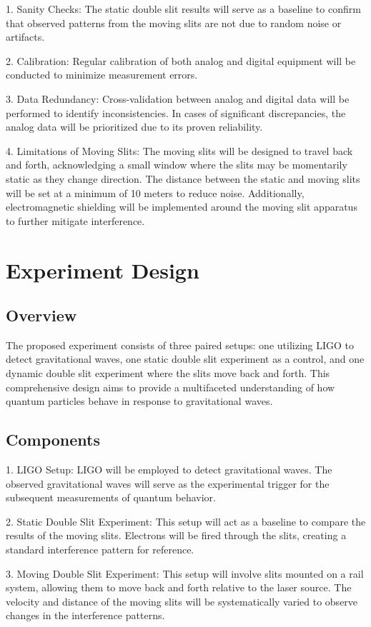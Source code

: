 \documentclass{article}
\begin{document}
1. Sanity Checks: The static double slit results will serve as a baseline to confirm that observed patterns from the moving slits are not due to random noise or artifacts.

2. Calibration: Regular calibration of both analog and digital equipment will be conducted to minimize measurement errors.

3. Data Redundancy: Cross-validation between analog and digital data will be performed to identify inconsistencies. In cases of significant discrepancies, the analog data will be prioritized due to its proven reliability.

4. Limitations of Moving Slits: The moving slits will be designed to travel back and forth, acknowledging a small window where the slits may be momentarily static as they change direction. The distance between the static and moving slits will be set at a minimum of 10 meters to reduce noise. Additionally, electromagnetic shielding will be implemented around the moving slit apparatus to further mitigate interference.

\section{Experiment Design}

\subsection{Overview}
The proposed experiment consists of three paired setups: one utilizing LIGO to detect gravitational waves, one static double slit experiment as a control, and one dynamic double slit experiment where the slits move back and forth. This comprehensive design aims to provide a multifaceted understanding of how quantum particles behave in response to gravitational waves.

\subsection{Components}
1. LIGO Setup: LIGO will be employed to detect gravitational waves. The observed gravitational waves will serve as the experimental trigger for the subsequent measurements of quantum behavior.

2. Static Double Slit Experiment: This setup will act as a baseline to compare the results of the moving slits. Electrons will be fired through the slits, creating a standard interference pattern for reference.

3. Moving Double Slit Experiment: This setup will involve slits mounted on a rail system, allowing them to move back and forth relative to the laser source. The velocity and distance of the moving slits will be systematically varied to observe changes in the interference patterns.
\end{document}

